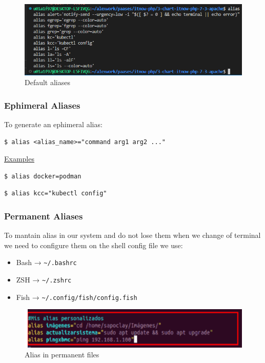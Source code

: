 \documentclass{article}
\newenvironment{codetemplate}[1][]{%
  \mybasecolorbox[#1]
  \itshape
}{%
  \endmybasecolorbox
}
\begin{document}
\begin{figure}[H]
    \centering
    \includegraphics[scale=0.6]{pictures/image45.PNG}
    \caption{Default aliases}
\end{figure}

\subsubsection{Ephimeral Aliases}
To generate an ephimeral alias:
\begin{codetemplate}
\begin{verbatim}
$ alias <alias_name>="command arg1 arg2 ..."
\end{verbatim}
\end{codetemplate}
\underline{Examples}
\begin{codetemplate}
\begin{verbatim}
$ alias docker=podman
\end{verbatim}
\end{codetemplate}

\begin{codetemplate}
\begin{verbatim}
$ alias kcc="kubectl config"
\end{verbatim}
\end{codetemplate}

\subsubsection{Permanent Aliases}
To mantain alias in our system and do not lose them when we change of terminal we need to configure them on the shell config file we use:

\begin{itemize}
    \item Bash → \verb|~/.bashrc|
    \item ZSH → \verb|~/.zshrc|
    \item Fish → \verb|~/.config/fish/config.fish|
\end{itemize}

\begin{figure}[H]
    \centering
    \includegraphics[scale=0.6]{pictures/image2.PNG}
    \caption{Alias in permanent files}
    \label{export}
\end{figure}
\end{document}
